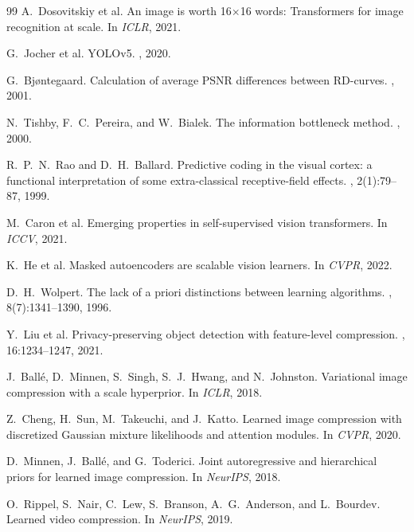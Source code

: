 \documentclass{article}
\begin{document}
\begin{thebibliography}{99}
A.~Dosovitskiy et al.
\newblock An image is worth 16$\times$16 words: Transformers for image recognition at scale.
\newblock In {\em ICLR}, 2021.

G.~Jocher et al.
\newblock YOLOv5.
, 2020.

G.~Bj{\o}ntegaard.
\newblock Calculation of average PSNR differences between RD-curves.
, 2001.

N.~Tishby, F.~C.~Pereira, and W.~Bialek.
\newblock The information bottleneck method.
, 2000.

R.~P.~N.~Rao and D.~H.~Ballard.
\newblock Predictive coding in the visual cortex: a functional interpretation of some extra-classical receptive-field effects.
, 2(1):79--87, 1999.

M.~Caron et al.
\newblock Emerging properties in self-supervised vision transformers.
\newblock In {\em ICCV}, 2021.

K.~He et al.
\newblock Masked autoencoders are scalable vision learners.
\newblock In {\em CVPR}, 2022.

D.~H.~Wolpert.
\newblock The lack of a priori distinctions between learning algorithms.
, 8(7):1341--1390, 1996.

Y.~Liu et al.
\newblock Privacy-preserving object detection with feature-level compression.
, 16:1234--1247, 2021.

J.~Ball{\'e}, D.~Minnen, S.~Singh, S.~J.~Hwang, and N.~Johnston.
\newblock Variational image compression with a scale hyperprior.
\newblock In {\em ICLR}, 2018.

Z.~Cheng, H.~Sun, M.~Takeuchi, and J.~Katto.
\newblock Learned image compression with discretized Gaussian mixture likelihoods and attention modules.
\newblock In {\em CVPR}, 2020.

D.~Minnen, J.~Ball{\'e}, and G.~Toderici.
\newblock Joint autoregressive and hierarchical priors for learned image compression.
\newblock In {\em NeurIPS}, 2018.

O.~Rippel, S.~Nair, C.~Lew, S.~Branson, A.~G.~Anderson, and L.~Bourdev.
\newblock Learned video compression.
\newblock In {\em NeurIPS}, 2019.


\end{thebibliography}
\end{document}
